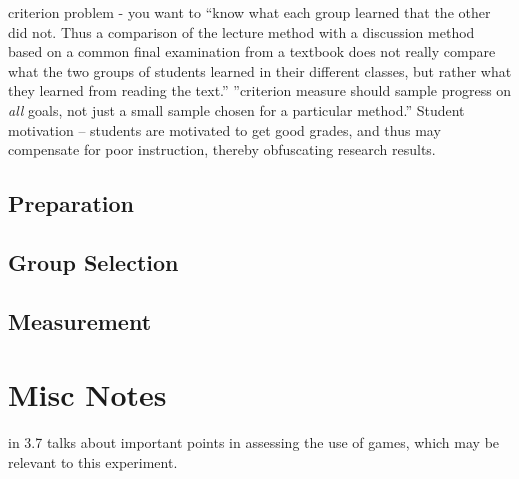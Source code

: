 criterion problem - you want to ``know what each group learned that the other did not.  Thus a comparison of the lecture method with a discussion method based on a common final examination from a textbook does not really compare what the two groups of students learned in their different classes, but rather what they learned from reading the text.''  ''criterion measure should sample progress on \textit{all} goals, not just a small sample chosen for a particular method.''  Student motivation -- students are motivated to get good grades, and thus may compensate for poor instruction, thereby obfuscating research results.

\subsection{Preparation}


\subsection{Group Selection}


\subsection{Measurement}

\section{Misc Notes}

\cite{Bayliss09} in 3.7 talks about important points in assessing the use of games, which may be relevant to this experiment.